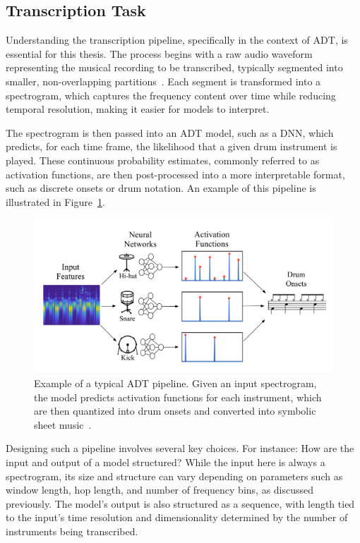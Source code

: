 \subsection{Transcription Task}

Understanding the transcription pipeline, specifically in the context of \gls{ADT}, is essential for this thesis. The process begins with a raw audio waveform representing the musical recording to be transcribed, typically segmented into smaller, non-overlapping partitions~\cite{vogl2018multiinstrumentdrumtranscription, gardner2022mt3multitaskmultitrackmusic}. Each segment is transformed into a spectrogram, which captures the frequency content over time while reducing temporal resolution, making it easier for models to interpret. 

The spectrogram is then passed into an \gls{ADT} model, such as a \gls{DNN}, which predicts, for each time frame, the likelihood that a given drum instrument is played. These continuous probability estimates, commonly referred to as activation functions, are then post-processed into a more interpretable format, such as discrete onsets or drum notation. An example of this pipeline is illustrated in Figure~\ref{ADTFigure}.

\begin{figure}[H]
    \centering
    \includegraphics[scale=1.9]{figures/adtpipeline.png}
    \caption{Example of a typical \gls{ADT} pipeline. Given an input spectrogram, the model predicts activation functions for each instrument, which are then quantized into drum onsets and converted into symbolic sheet music~\cite{Southall2016AutomaticDT}.}
    \label{ADTFigure}
\end{figure}

Designing such a pipeline involves several key choices. For instance: How are the input and output of a model structured? While the input here is always a spectrogram, its size and structure can vary depending on parameters such as window length, hop length, and number of frequency bins, as discussed previously. The model's output is also structured as a sequence, with length tied to the input's time resolution and dimensionality determined by the number of instruments being transcribed.

